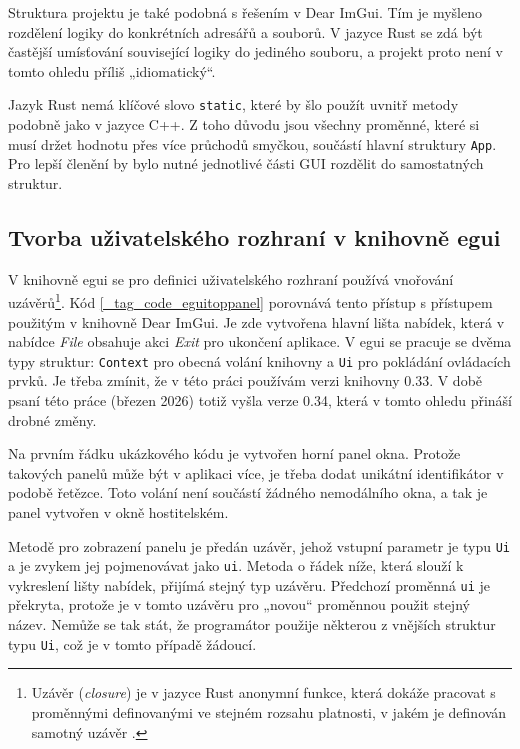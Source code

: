 \documentclass[FM,DP]{tulthesis}
\begin{document}
	Struktura projektu je také podobná s řešením v Dear ImGui. Tím je myšleno rozdělení logiky do konkrétních adresářů a souborů. V jazyce Rust se zdá být častější umísťování související logiky do jediného souboru, a projekt proto není v tomto ohledu příliš „idiomatický“.
	
	Jazyk Rust nemá klíčové slovo \texttt{static}, které by šlo použít uvnitř metody podobně jako v jazyce C++. Z toho důvodu jsou všechny proměnné, které si musí držet hodnotu přes více průchodů smyčkou, součástí hlavní struktury \texttt{App}. Pro lepší členění by bylo nutné jednotlivé části GUI rozdělit do samostatných struktur.
	
	\subsection{Tvorba uživatelského rozhraní v knihovně egui}
	
	V knihovně egui se pro definici uživatelského rozhraní používá vnořování uzávěrů\footnote{Uzávěr (\textit{closure}) je v jazyce Rust anonymní funkce, která dokáže pracovat s proměnnými definovanými ve stejném rozsahu platnosti, v jakém je definován samotný uzávěr \cite{book_rust}.}. Kód \ref{_tag_code_eguitoppanel} porovnává tento přístup s přístupem použitým v knihovně Dear ImGui. Je zde vytvořena hlavní lišta nabídek, která v nabídce \textit{File} obsahuje akci \textit{Exit} pro ukončení aplikace. V egui se pracuje se dvěma typy struktur: \texttt{Context} pro obecná volání knihovny a \texttt{Ui} pro pokládání ovládacích prvků. Je třeba zmínit, že v této práci používám verzi knihovny 0.33. V době psaní této práce (březen 2026) totiž vyšla verze 0.34, která v tomto ohledu přináší drobné změny.
	
	\begin{code}[ht]
		
		\caption{egui a Dear ImGui: uzávěry a stavový automat}
		\label{_tag_code_eguitoppanel}
	\end{code}
	
	Na prvním řádku ukázkového kódu je vytvořen horní panel okna. Protože takových panelů může být v aplikaci více, je třeba dodat unikátní identifikátor v podobě řetězce. Toto volání není součástí žádného nemodálního okna, a tak je panel vytvořen v okně hostitelském.
	
	Metodě pro zobrazení panelu je předán uzávěr, jehož vstupní parametr je typu \texttt{Ui} a je zvykem jej pojmenovávat jako \texttt{ui}. Metoda o řádek níže, která slouží k vykreslení lišty nabídek, přijímá stejný typ uzávěru. Předchozí proměnná \texttt{ui} je překryta, protože je v tomto uzávěru pro „novou“ proměnnou použit stejný název. Nemůže se tak stát, že programátor použije některou z vnějších struktur typu \texttt{Ui}, což je v tomto případě žádoucí.
	
\end{document}
